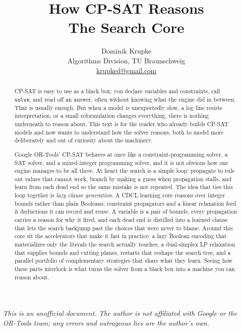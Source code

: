 \documentclass[11pt]{article}
\title{\textbf{How CP-SAT Reasons}\\[0.3em]\large The Search Core}
\author{Dominik Krupke\\[0.2em]
  \normalsize Algorithms Division, TU Braunschweig\\
  \normalsize \href{mailto:krupked@gmail.com}{krupked@gmail.com}}
\date{}
\begin{document}
\maketitle
\vspace{-2.5em}

\begin{center}
\footnotesize\itshape
This is an unofficial document. The author is not affiliated with Google or
the OR-Tools team; any errors and outrageous lies are the author's own.
\end{center}
\vspace{0.5em}

\thispagestyle{titlefooter}

\begin{abstract}
\noindent CP-SAT is easy to use as a black box: you declare variables and
constraints, call \texttt{solve}, and read off an answer, often without knowing
what the engine did in between. That is usually enough. But when a model is
unexpectedly slow, a log line resists interpretation, or a small reformulation
changes everything, there is nothing underneath to reason about. This text is for
the reader who already builds CP-SAT models and now wants to understand how the
solver reasons, both to model more deliberately and out of curiosity about the
machinery.

Google OR-Tools' CP-SAT behaves at once like a constraint-programming solver, a
SAT solver, and a mixed-integer programming solver, and it is not obvious how one
engine manages to be all three. At heart the search is a simple loop: propagate to
rule out values that cannot work, branch by making a guess when propagation stalls,
and learn from each dead end so the same mistake is not repeated. The idea that
ties this loop together is \emph{lazy clause
generation}. A CDCL learning core reasons over integer bounds rather than plain
Booleans; constraint propagators and a linear relaxation feed it deductions it can
record and reuse. A variable is a pair of bounds, every propagation carries a
reason for why it fired, and each dead end is distilled into a learned clause that
lets the search backjump past the choices that were never to blame. Around this
core sit the accelerators that make it fast in practice: a lazy Boolean encoding
that materializes only the literals the search actually touches, a dual-simplex LP
relaxation that supplies bounds and cutting planes, restarts that reshape the
search tree, and a parallel portfolio of complementary strategies that share what
they learn. Seeing how these parts interlock is what turns the solver from a black
box into a machine you can reason about.
\end{abstract}









\printbibliography[title={References}]
\end{document}
